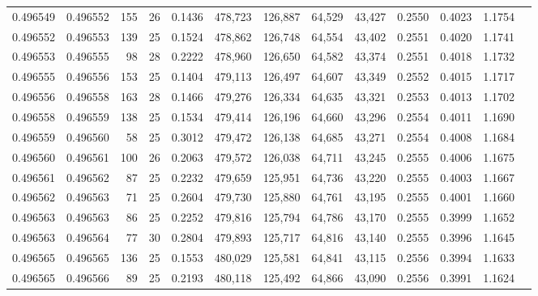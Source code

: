 \begin{tabular}{rrrrrrrrrrrrr}
0.496549 & 0.496552 & 155 &  26 &                                     0.1436 & 478,723 & 126,887 &  64,529 &  43,427 & 0.2550 & 0.4023 & 1.1754 \\
0.496552 & 0.496553 & 139 &  25 &                                     0.1524 & 478,862 & 126,748 &  64,554 &  43,402 & 0.2551 & 0.4020 & 1.1741 \\
0.496553 & 0.496555 &  98 &  28 &                                     0.2222 & 478,960 & 126,650 &  64,582 &  43,374 & 0.2551 & 0.4018 & 1.1732 \\
0.496555 & 0.496556 & 153 &  25 &                                     0.1404 & 479,113 & 126,497 &  64,607 &  43,349 & 0.2552 & 0.4015 & 1.1717 \\
0.496556 & 0.496558 & 163 &  28 &                                     0.1466 & 479,276 & 126,334 &  64,635 &  43,321 & 0.2553 & 0.4013 & 1.1702 \\
0.496558 & 0.496559 & 138 &  25 &                                     0.1534 & 479,414 & 126,196 &  64,660 &  43,296 & 0.2554 & 0.4011 & 1.1690 \\
0.496559 & 0.496560 &  58 &  25 &                                     0.3012 & 479,472 & 126,138 &  64,685 &  43,271 & 0.2554 & 0.4008 & 1.1684 \\
0.496560 & 0.496561 & 100 &  26 &                                     0.2063 & 479,572 & 126,038 &  64,711 &  43,245 & 0.2555 & 0.4006 & 1.1675 \\
0.496561 & 0.496562 &  87 &  25 &                                     0.2232 & 479,659 & 125,951 &  64,736 &  43,220 & 0.2555 & 0.4003 & 1.1667 \\
0.496562 & 0.496563 &  71 &  25 &                                     0.2604 & 479,730 & 125,880 &  64,761 &  43,195 & 0.2555 & 0.4001 & 1.1660 \\
0.496563 & 0.496563 &  86 &  25 &                                     0.2252 & 479,816 & 125,794 &  64,786 &  43,170 & 0.2555 & 0.3999 & 1.1652 \\
0.496563 & 0.496564 &  77 &  30 &                                     0.2804 & 479,893 & 125,717 &  64,816 &  43,140 & 0.2555 & 0.3996 & 1.1645 \\
0.496565 & 0.496565 & 136 &  25 &                                     0.1553 & 480,029 & 125,581 &  64,841 &  43,115 & 0.2556 & 0.3994 & 1.1633 \\
0.496565 & 0.496566 &  89 &  25 &                                     0.2193 & 480,118 & 125,492 &  64,866 &  43,090 & 0.2556 & 0.3991 & 1.1624 \\

\end{tabular}
